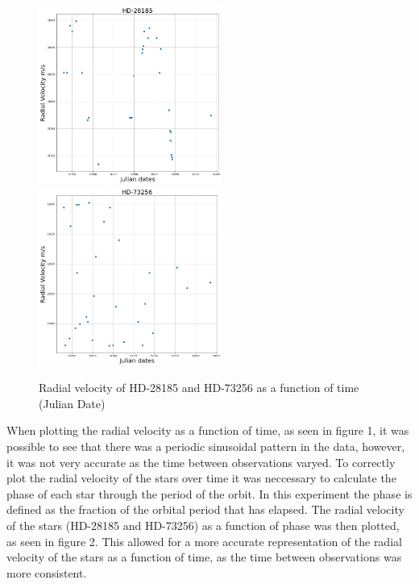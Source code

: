 \documentclass[]{article}
\begin{document}
\begin{figure}[h]
\includegraphics[width=6cm]{images/HD-28185_init.png}
\includegraphics[width=6cm]{images/HD-73256_init.png}
\caption{Radial velocity of HD-28185 and HD-73256 as a function of time (Julian Date)}
\label{fig:HD-_init}
\end{figure}

When plotting the radial velocity as a function of time, as seen in figure 1, it was
possible to see that there was a periodic sinusoidal pattern in the data, however, 
it was not very accurate as the time between observations varyed.
To correctly plot the radial velocity of the stars over time it was neccessary 
to calculate the phase of each star through the period of the orbit. In this experiment
the phase is defined as the fraction of the orbital period that has elapsed.
The radial velocity of the stars (HD-28185 and HD-73256) as a function of phase 
was then plotted, as seen in figure 2. This allowed for a more accurate representation
of the radial velocity of the stars as a function of time, as the time between 
observations was more consistent.
\par
\newpage
\end{document}
